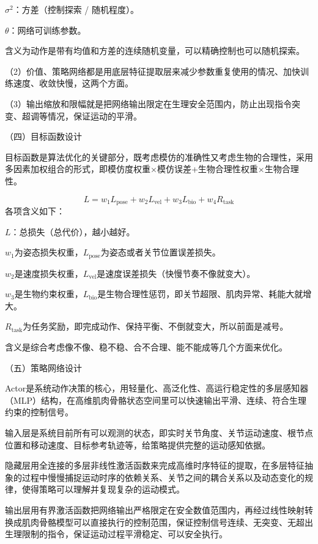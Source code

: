 \(\sigma^{2}\)：方差（控制探索 / 随机程度）。

\(\theta\)：网络可训练参数。

含义为动作是带有均值和方差的连续随机变量，可以精确控制也可以随机探索。

（2）价值、策略网络都是用底层特征提取层来减少参数重复使用的情况、加快训练速度、收敛快慢，这两个方面。

（3）输出缩放和限幅就是把网络输出限定在生理安全范围内，防止出现指令突变、超调等情况，保证运动的平滑。

（四）目标函数设计

目标函数是算法优化的关键部分，既考虑模仿的准确性又考虑生物的合理性，采用多因素加权组合的形式，即模仿度权重×模仿误差+生物合理性权重×生物合理性。

\begin{equation}
L=w_1L_{\mathrm{pose}}+w_2L_{\mathrm{vel}}+w_3L_{\mathrm{bio}}+w_4R_{\mathrm{task}}
\tag{3-4}
\end{equation}
各项含义如下：

$L$：总损失（总代价），越小越好。

\(w_{1}\)为姿态损失权重，\(L_{\mathrm{pose}}\)为姿态或者关节位置误差损失。

\(w_{2}\)是速度损失权重，\(L_{\mathrm{vel}}\)是速度误差损失（快慢节奏不像就变大）。

\(w_{3}\)是生物约束权重，\(L_{\mathrm{bio}}\)是生物合理性惩罚，即关节超限、肌肉异常、耗能大就增大。

\(R_{\mathrm{task}}\)为任务奖励，即完成动作、保持平衡、不倒就变大，所以前面是减号。

含义是综合考虑像不像、稳不稳、合不合理、能不能成等几个方面来优化。

（五）策略网络设计

Actor是系统动作决策的核心，用轻量化、高泛化性、高运行稳定性的多层感知器（MLP）结构，在高维肌肉骨骼状态空间里可以快速输出平滑、连续、符合生理约束的控制信号。

输入层是系统目前所有可以观测的状态，即实时关节角度、关节运动速度、根节点位置和移动速度、目标参考轨迹等，给策略提供完整的运动感知依据。

隐藏层用全连接的多层非线性激活函数来完成高维时序特征的提取，在多层特征抽象的过程中慢慢捕捉运动时序的依赖关系、关节之间的耦合关系以及动态变化的规律，使得策略可以理解并复现复杂的运动模式。

输出层用有界激活函数把网络输出严格限定在安全数值范围内，再经过线性映射转换成肌肉骨骼模型可以直接执行的控制范围，保证控制信号连续、无突变、无超出生理限制的指令，保证运动过程平滑稳定、可以安全执行。

